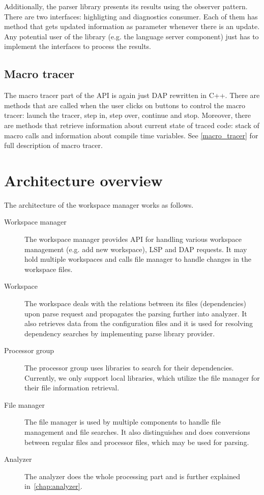 Additionally, the parser library presents its results using the observer pattern. There are two interfaces: highligting and diagnostics consumer. Each of them has method  that gets updated information as parameter whenever there is an update. Any potential user of the library (e.g. the language server component) just has to implement the interfaces to process the results.

\subsection{Macro tracer}

The macro tracer part of the API is again just DAP rewritten in C++. There are methods that are called when the user clicks on buttons to control the macro tracer: launch the tracer, step in, step over, continue and stop. Moreover, there are methods that retrieve information about current state of traced code: stack of macro calls and information about compile time variables. See \cref{macro_tracer} for full description of macro tracer.

\section{Architecture overview}
The architecture of the workspace manager works as follows.

\begin{description}
	\item[Workspace manager] The workspace manager provides API for handling various workspace management (e.g. add new workspace), LSP and DAP requests. It may hold multiple workspaces and calls 
	file manager to handle changes in the workspace files.
	\item[Workspace] The workspace deals with the relations between its files (dependencies) upon parse request and propagates the parsing further into analyzer. It also retrieves data from the configuration files and it is used for resolving dependency searches by implementing parse library provider.
	\item[Processor group]  
	The processor group uses libraries to search for their dependencies. Currently, we only support local libraries, which utilize the file manager for their file information retrieval.
	\item[File manager] 
	The file manager is used by multiple components to handle file management and file searches. It also distinguishes and does conversions between regular files and processor files, which may be used for parsing.
	\item[Analyzer] The analyzer does the whole processing part and is further explained in~\cref{chap:analyzer}.
\end{description}

